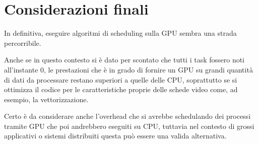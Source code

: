 \documentclass[../relazione.tex]{subfiles}
\begin{document}
\section{Considerazioni finali}
In definitiva, eseguire algoritmi di scheduling sulla GPU sembra una strada percorribile.

Anche se in questo contesto si è dato per scontato che tutti i task fossero noti all'instante 0, le prestazioni che è in grado di fornire un GPU su grandi quantità di dati da processare restano superiori a quelle delle CPU, soprattutto se si ottimizza il codice per le caratteristiche proprie delle schede video come, ad esempio, la vettorizzazione.

Certo è da considerare anche l'overhead che si avrebbe schedulando dei processi tramite GPU che poi andrebbero eseguiti su CPU, tuttavia nel contesto di grossi applicativi o sistemi distribuiti questa può essere una valida alternativa.
\end{document}
